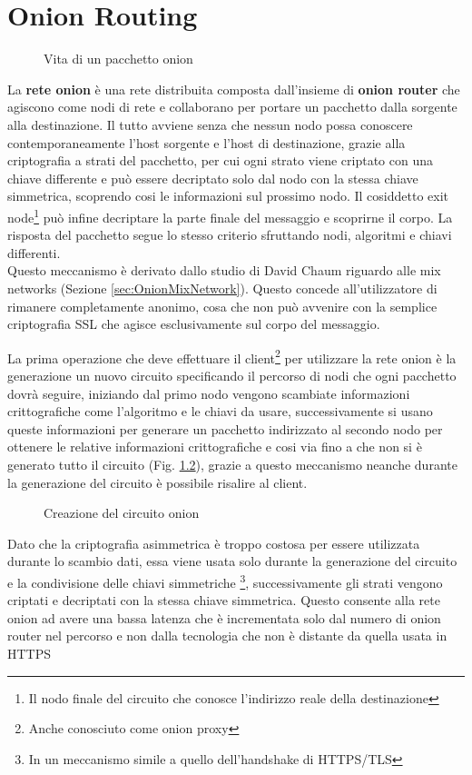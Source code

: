 \chapter{Onion Routing}
\label{chap:Capitolo1}

\begin{figure}[htpb!]
    \centering
    
    \caption{Vita di un pacchetto onion}
    \label{fig:routing}
\end{figure}

La \textbf{rete onion} è una rete distribuita composta dall'insieme di \textbf{onion router} che agiscono come nodi di rete e collaborano per portare un pacchetto dalla sorgente alla destinazione. 
Il tutto avviene senza che nessun nodo possa conoscere contemporaneamente l'host sorgente e l'host di destinazione, grazie alla criptografia a strati del pacchetto, per cui ogni strato viene criptato con una chiave differente e può essere decriptato solo dal nodo con la stessa chiave simmetrica, scoprendo cosi le informazioni sul prossimo nodo. 
Il cosiddetto exit node\footnote{Il nodo finale del circuito che conosce l'indirizzo reale della destinazione} può infine decriptare la parte finale del messaggio e scoprirne il corpo. 
La risposta del pacchetto segue lo stesso criterio sfruttando nodi, algoritmi e chiavi differenti. \\
Questo meccanismo è derivato dallo studio di David Chaum riguardo alle mix networks (Sezione \ref{sec:OnionMixNetwork}).
Questo concede all'utilizzatore di rimanere completamente anonimo, cosa che non può avvenire con la semplice criptografia SSL che agisce esclusivamente sul corpo del messaggio.

\newpage La prima operazione che deve effettuare il client\footnote{Anche conosciuto come onion proxy} per utilizzare la rete onion è la generazione un nuovo circuito specificando il percorso di nodi che ogni pacchetto dovrà seguire, iniziando dal primo nodo vengono scambiate informazioni crittografiche come l'algoritmo e le chiavi da usare, successivamente si usano queste informazioni per generare un pacchetto indirizzato al secondo nodo per ottenere le relative informazioni crittografiche e cosi via fino a che non si è generato tutto il circuito (Fig. \ref{fig:circuitCreation}), grazie a questo meccanismo neanche durante la generazione del circuito è possibile risalire al client. 

\begin{figure}[htpb!]
    \centering
    
    \caption{Creazione del circuito onion}
    \label{fig:circuitCreation}
\end{figure}
Dato che la criptografia asimmetrica è troppo costosa per essere utilizzata durante lo scambio dati, essa viene usata solo durante la generazione del circuito e la condivisione delle chiavi simmetriche \footnote{In un meccanismo simile a quello dell'handshake di HTTPS/TLS}, successivamente gli strati vengono criptati e decriptati con la stessa chiave simmetrica. 
Questo consente alla rete onion ad avere una bassa latenza che è incrementata solo dal numero di onion router nel percorso e non dalla tecnologia che non è distante da quella usata in HTTPS 
\cite{OnionRouting}

